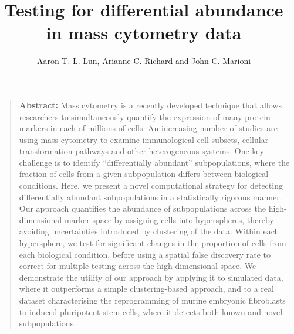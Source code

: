 \documentclass{article}
\title{Testing for differential abundance in mass cytometry data}
\author{Aaron T. L. Lun, Arianne C. Richard and John C. Marioni}
\begin{document}
\maketitle

\begin{quote}
\textbf{Abstract:} Mass cytometry is a recently developed technique that allows researchers to simultaneously quantify the expression of many protein markers in each of millions of cells. 
An increasing number of studies are using mass cytometry to examine immunological cell subsets, cellular transformation pathways and other heterogeneous systems.
One key challenge is to identify ``differentially abundant'' subpopulations, where the fraction of cells from a given subpopulation differs between biological conditions. 
Here, we present a novel computational strategy for detecting differentially abundant subpopulations in a statistically rigorous manner. 
Our approach quantifies the abundance of subpopulations across the high-dimensional marker space by assigning cells into hyperspheres, thereby avoiding uncertainties introduced by clustering of the data. 
Within each hypersphere, we test for significant changes in the proportion of cells from each biological condition, before using a spatial false discovery rate to correct for multiple testing across the high-dimensional space. 
We demonstrate the utility of our approach by applying it to simulated data, where it outperforms a simple clustering-based approach, and to a real dataset characterising the reprogramming of murine embryonic fibroblasts to induced pluripotent stem cells, where it detects both known and novel subpopulations.
\end{quote}
\end{document}
